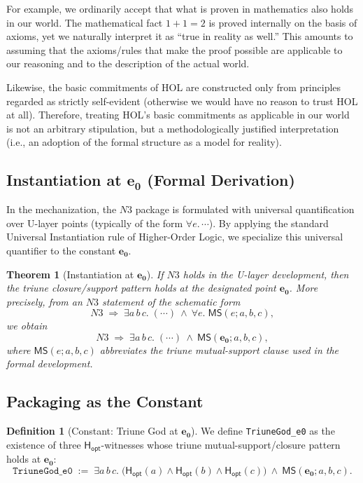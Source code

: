 \documentclass[a4paper, 11pt]{article}
\theoremstyle{plain}
\newtheorem{theorem}{Theorem}[section]
\theoremstyle{definition}
\newtheorem{definition}{Definition}[section]
\newcommand{\Hopt}{\mathsf{H_{opt}}}       %
\newcommand{\eZero}{\mathbf{e_0}}         %
\begin{document}
For example, we ordinarily accept that what is proven in mathematics also holds in our world. The mathematical fact $1+1=2$ is proved internally on the basis of axioms, yet we naturally interpret it as ``true in reality as well.'' This amounts to assuming that the axioms/rules that make the proof possible are applicable to our reasoning and to the description of the actual world.

Likewise, the basic commitments of HOL are constructed only from principles regarded as strictly self-evident (otherwise we would have no reason to trust HOL at all). Therefore, treating HOL's basic commitments as applicable in our world is not an arbitrary stipulation, but a methodologically justified interpretation (i.e., an adoption of the formal structure as a model for reality).

\subsection{Instantiation at $\eZero$ (Formal Derivation)}

In the mechanization, the $N3$ package is formulated with universal quantification over U-layer points (typically of the form $\forall e.\, \cdots$).
By applying the standard Universal Instantiation rule of Higher-Order Logic, we specialize this universal quantifier to the constant $\eZero$.

\begin{theorem}[Instantiation at $\eZero$]
\label{thm:inst_e0}
If $N3$ holds in the U-layer development, then the triune closure/support pattern holds at the designated point $\eZero$.
More precisely, from an $N3$ statement of the schematic form
\[
N3 \;\Longrightarrow\; \exists a\,b\,c.\; (\cdots)\ \land\ \forall e.\; \mathsf{MS}(e;a,b,c),
\]
we obtain
\[
N3 \;\Longrightarrow\; \exists a\,b\,c.\; (\cdots)\ \land\ \mathsf{MS}(\eZero;a,b,c),
\]
where $\mathsf{MS}(e;a,b,c)$ abbreviates the triune mutual-support clause used in the formal development.
\end{theorem}

\subsection{Packaging as the Constant}

\begin{definition}[Constant: Triune God at $\eZero$]
\label{def:TriuneGod_e0}
We define \texttt{TriuneGod\_e0} as the existence of three $\Hopt$-witnesses whose triune mutual-support/closure pattern holds at $\eZero$:
\[
\texttt{TriuneGod\_e0}\;:=\;\exists a\,b\,c.\;
\bigl(\Hopt(a)\land \Hopt(b)\land \Hopt(c)\bigr)\ \land\ \mathsf{MS}(\eZero;a,b,c).
\]
\end{definition}
\end{document}
